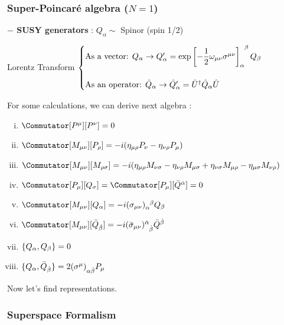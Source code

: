 \documentclass[11pt,letterpaper]{article}
\begin{document}
\VS\VS

\subsubsection{Super-Poincar\'{e} algebra ($N=1$)}

\vs

{\bfseries $-$ SUSY generators} : $Q_\alpha \sim$ Spinor (spin 1/2)

\HS Lorentz Transform $
\begin{cases}
	\text{As a vector: } Q_\alpha \rightarrow Q'_\alpha = \exp\tensor{\left[-\dfrac{1}{2}\omega_{\mu\nu} \sigma^{\mu\nu} \right]}{_\alpha ^\beta} Q_\beta \\
	\\
	\text{As an operator: } \hat{Q}_\alpha \rightarrow \hat{Q}'_\alpha = \hat{U}^\dagger \hat{Q}_\alpha \hat{U}
\end{cases}
$

\vs
 
For some calculations, we can derive next algebra :
\begin{enumerate}[(i)]
	\item $\Commutator[P^\mu][P^\nu] = 0$
	\item $\Commutator[M_{\mu\nu}][P_\rho] = -i(\eta_{\mu\rho}P_\nu - \eta_{\nu\rho}P_\mu )$
	\item $\Commutator[M_{\mu\nu}][M_{\rho\sigma}] = -i(\eta_{\mu\rho}M_{\nu\sigma}-\eta_{\nu\rho}M_{\mu\sigma} + \eta_{\nu\sigma}M_{\mu\rho} - \eta_{\mu\sigma}M_{\nu\rho})$
	\item $\Commutator[P_\mu][Q_\sigma] = \Commutator[P_\mu][\bar{Q}^{\dot{\alpha}}] = 0$
	\item $\Commutator[M_{\mu\nu}][Q_\alpha] = -i\tensor{(\sigma_{\mu\nu})}{_\alpha^\beta}Q_\beta$
	\item $\Commutator[M_{\mu\nu}][\bar{Q}_{\dot{\beta}}] = -i\tensor{(\bar{\sigma}_{\mu\nu})}{^{\dot{\alpha}}_{\dot{\beta}}}\bar{Q}^{\dot{\beta}}$
	\item $\{ Q_\alpha , Q_\beta \} = 0$
	\item $\ACommutator{Q_\alpha}{\bar{Q}_{\dot{\beta}}} = 2\tensor{(\sigma^\mu)}{_{\alpha\dot{\beta}}} P_\mu$
\end{enumerate}

Now let's find representations.

\pagebreak

\subsubsection{Superspace Formalism}
\end{document}
